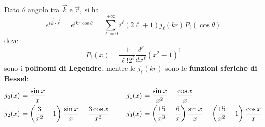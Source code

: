 \documentclass[11pt, a4paper]{scrartcl}
\theoremstyle{style}
\numberwithin{equation}{subsection}
\begin{document}
Dato $\theta $ angolo tra $\vec{k}$ e $\vec{r}$, si ha
\[
e ^{i \vec{k}\cdot \vec{r}}  = e^{i kr \cos \theta } = \sum_{\ell =0}^{+\infty} i^\ell  (2\ell +1) j_\ell (kr) P_\ell (\cos \theta )
\] 
dove 
\[
P_\ell (x) = \frac{1}{\ell !2^\ell } \frac{d ^\ell }{d x^\ell }  \left(x^2 - 1\right) ^\ell 
\] 
sono i \textbf{polinomi di Legendre}, mentre le $j_\ell (kr)$ sono le \textbf{funzioni sferiche di Bessel}:
\begin{align*}
	&j_0(x) = \frac{\sin x }{x} &\hspace{.5cm} &j_1(x) = \frac{\sin x}{ x^2} - \frac{\cos x }{x} \\
	&j_2(x) = \left(\frac{3}{x^2}-1\right) \frac{\sin x}{x}- \frac{3 \cos x}{x^2} & \hspace{.5cm} &j_3(x) = \left(\frac{15}{x^3}-\frac{6}{x}\right) \frac{\sin x}{x} - \left(\frac{15}{x^2}-1\right) \frac{\cos x}{x}
\end{align*}
\end{document}
